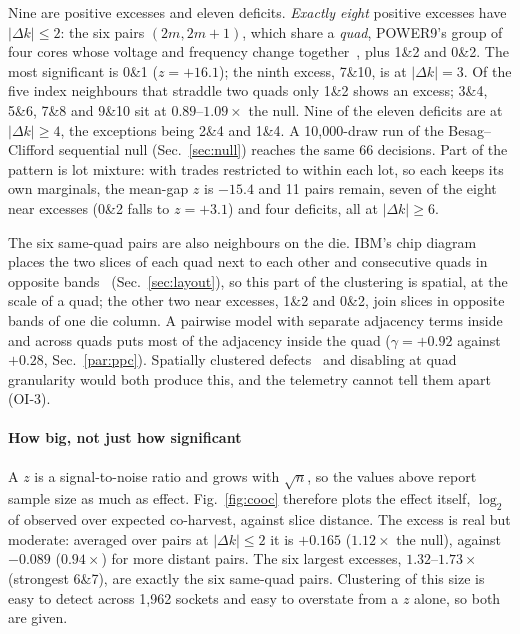 \documentclass[10pt,conference]{IEEEtran}
\begin{document}
Nine are positive excesses and eleven deficits. \emph{Exactly eight} positive excesses have
$|\Delta k|\le2$: the six pairs $(2m,2m{+}1)$, which share a \emph{quad}, POWER9's group of four
cores whose voltage and frequency change together~\cite{ibm_p9um}, plus 1\&2 and 0\&2. The most
significant is 0\&1 ($z=+16.1$); the ninth excess, 7\&10, is at $|\Delta k|=3$. Of the five index
neighbours that straddle two quads only 1\&2 shows an excess; 3\&4, 5\&6, 7\&8 and 9\&10 sit at
$0.89$--$1.09\times$ the null. Nine of the eleven deficits are at $|\Delta k|\ge4$, the exceptions
being 2\&4 and 1\&4. A 10{,}000-draw run of the Besag--Clifford sequential null (Sec.~\ref{sec:null}) reaches the same
66 decisions. Part of the
pattern is lot mixture: with trades restricted to within each lot, so each keeps its own marginals,
the mean-gap $z$ is $-15.4$ and 11 pairs remain, seven of the eight near excesses (0\&2 falls to
$z=+3.1$) and four deficits, all at $|\Delta k|\ge6$.

The six same-quad pairs are also neighbours on the die. IBM's chip diagram places the two slices of
each quad next to each other and consecutive quads in opposite bands~\cite[Fig.~2]{ibm_p9regs}
(Sec.~\ref{sec:layout}), so this part of the clustering is spatial, at the scale of a quad; the
other two near excesses, 1\&2 and 0\&2, join slices in opposite bands of one die column. A pairwise
model with separate adjacency terms inside and across quads puts most of the adjacency inside the
quad ($\gamma=+0.92$ against $+0.28$, Sec.~\ref{par:ppc}). Spatially clustered
defects~\cite{koren1993negbinom,bae2007waferyield} and disabling at quad granularity would both
produce this, and the telemetry cannot tell them apart (OI-3).

\paragraph*{How big, not just how significant} A $z$ is a signal-to-noise ratio and grows with
$\sqrt{n}$, so the values above report sample size as much as effect. Fig.~\ref{fig:cooc}
therefore plots the effect itself, $\log_2$ of observed over expected co-harvest, against slice
distance. The excess is real but moderate: averaged over pairs at $|\Delta k|\le2$ it is
$+0.165$ ($1.12\times$ the null), against $-0.089$ ($0.94\times$) for more distant pairs. The six
largest excesses, $1.32$--$1.73\times$ (strongest 6\&7), are exactly the six same-quad pairs.
Clustering of this size is easy to detect across 1{,}962 sockets and easy to overstate from a $z$
alone, so both are given.
\end{document}
